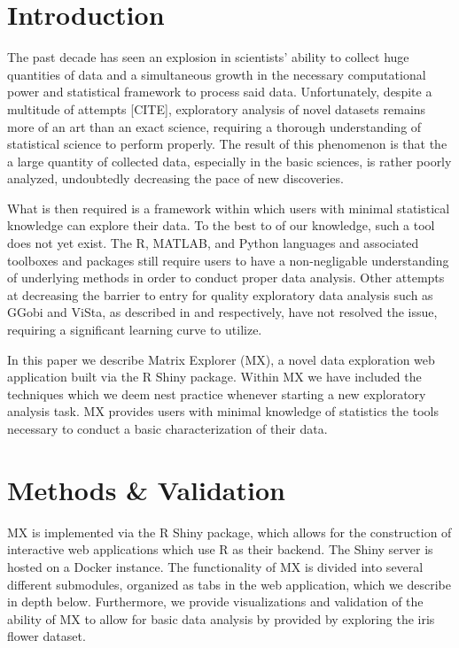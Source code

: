 \documentclass[12pt]{article}
\begin{document}
\newpage
{} %
\section{Introduction}
\label{sec:intro}

The past decade has seen an explosion in scientists' ability to collect huge quantities of data and a simultaneous growth in the necessary computational power and statistical framework to process said data. Unfortunately, despite a multitude of attempts [CITE], exploratory analysis of novel datasets remains more of an art than an exact science, requiring a thorough understanding of statistical science to perform properly. The result of this phenomenon is that the a large quantity of collected data, especially in the basic sciences, is rather poorly analyzed, undoubtedly decreasing the pace of new discoveries.

What is then required is a framework within which users with minimal statistical knowledge can explore their data. To the best to of our knowledge, such a tool does not yet exist. The R, MATLAB, and Python languages and associated toolboxes and packages still require users to have a non-negligable understanding of underlying methods in order to conduct proper data analysis. Other attempts at decreasing the barrier to entry for quality exploratory data analysis such as GGobi and ViSta, as described in \cite{swayne2003ggobi} and \cite{valero2011using} respectively, have not resolved the issue, requiring a significant learning curve to utilize.

In this paper we describe Matrix Explorer (MX), a novel data exploration web application built via the R Shiny package. Within MX we have included the techniques which we deem nest practice whenever starting a new exploratory analysis task. MX provides users with minimal knowledge of statistics the tools necessary to conduct a basic characterization of their data.

\section{Methods \& Validation}
\label{sec:meth}

MX is implemented via the R Shiny package, which allows for the construction of interactive web applications which use R as their backend. The Shiny server is hosted on a Docker instance. The functionality of MX is divided into several different submodules, organized as tabs in the web application, which we  describe in depth below. Furthermore, we provide visualizations and validation of the ability of MX to allow for basic data analysis by provided by exploring the iris flower dataset. 
\end{document}
